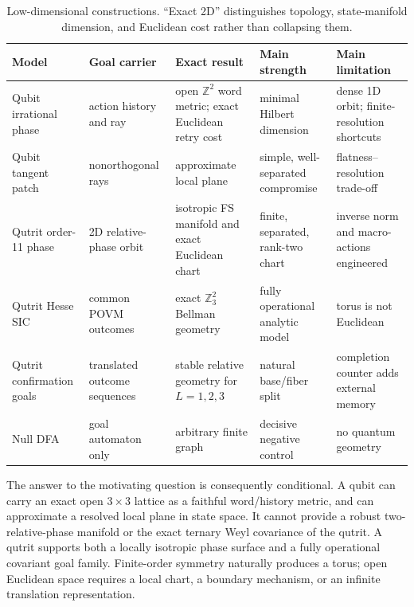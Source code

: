 \documentclass[11pt]{article}
\begin{document}
\begin{table}[t]
\centering
\caption{Low-dimensional constructions. ``Exact 2D'' distinguishes topology,
state-manifold dimension, and Euclidean cost rather than collapsing them.}
\label{tab:lowdim-summary}
\small
\begin{tabularx}{\textwidth}{lXXXX}
\toprule
Model & Goal carrier & Exact result & Main strength & Main limitation\\
\midrule
Qubit irrational phase & action history and ray & open $\mathbb Z^2$ word
metric; exact Euclidean retry cost & minimal Hilbert dimension & dense 1D
orbit; finite-resolution shortcuts\\
Qubit tangent patch & nonorthogonal rays & approximate local plane & simple,
well-separated compromise & flatness--resolution trade-off\\
Qutrit order-11 phase & 2D relative-phase orbit & isotropic FS manifold and
exact Euclidean chart & finite, separated, rank-two chart & inverse norm and
macro-actions engineered\\
Qutrit Hesse SIC & common POVM outcomes & exact $\mathbb Z_3^2$ Bellman
geometry & fully operational analytic model & torus is not Euclidean\\
Qutrit confirmation goals & translated outcome sequences & stable relative
geometry for $L=1,2,3$ & natural base/fiber split & completion counter adds
external memory\\
Null DFA & goal automaton only & arbitrary finite graph & decisive negative
control & no quantum geometry\\
\bottomrule
\end{tabularx}
\end{table}

The answer to the motivating question is consequently conditional. A qubit
can carry an exact open $3\times3$ lattice as a faithful word/history metric,
and can approximate a resolved local plane in state space. It cannot provide a
robust two-relative-phase manifold or the exact ternary Weyl covariance of the
qutrit. A qutrit supports both a locally isotropic phase surface and a fully
operational covariant goal family. Finite-order symmetry naturally produces a
torus; open Euclidean space requires a local chart, a boundary mechanism, or an
infinite translation representation.
\end{document}
